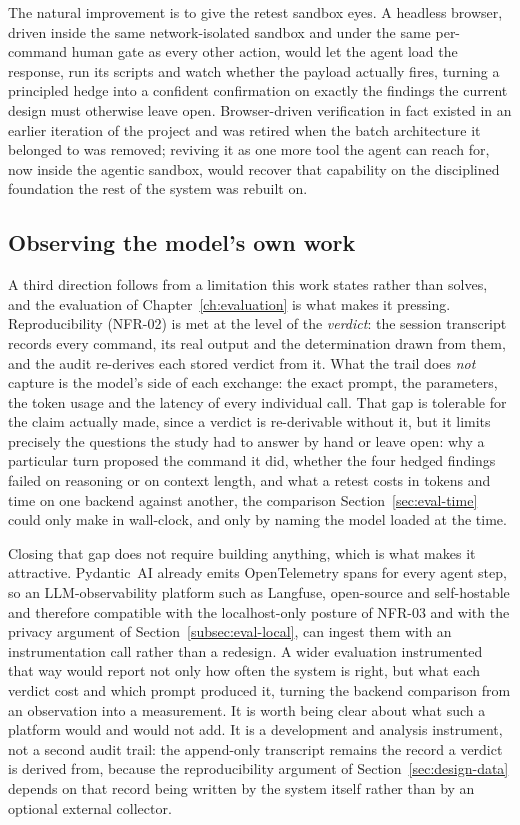 The natural improvement is to give the retest sandbox eyes. A headless browser, driven
inside the same network-isolated sandbox and under the same per-command human gate as
every other action, would let the agent load the response, run its scripts and watch
whether the payload actually fires, turning a principled hedge into a confident
confirmation on exactly the findings the current design must otherwise leave open.
Browser-driven verification in fact existed in an earlier iteration of the project and
was retired when the batch architecture it belonged to was removed; reviving it as one
more tool the agent can reach for, now inside the agentic sandbox, would recover that
capability on the disciplined foundation the rest of the system was rebuilt on.

\subsection{Observing the model's own work}
\label{subsec:future-observability}

A third direction follows from a limitation this work states rather than solves, and
the evaluation of Chapter~\ref{ch:evaluation} is what makes it pressing. Reproducibility
(NFR-02) is met at the level of the \emph{verdict}: the session transcript records every
command, its real output and the determination drawn from them, and the audit re-derives
each stored verdict from it. What the trail does \emph{not} capture is the model's side
of each exchange: the exact prompt, the parameters, the token usage and the latency of
every individual call. That gap is tolerable for the claim actually made, since a verdict
is re-derivable without it, but it limits precisely the questions the study
had to answer by hand or leave open: why a particular turn proposed the command it did,
whether the four hedged findings failed on reasoning or on context length, and what a
retest costs in tokens and time on one backend against another, the comparison
Section~\ref{sec:eval-time} could only make in wall-clock, and only by naming the model
loaded at the time.

Closing that gap does not require building anything, which is what makes it attractive.
Pydantic~AI already emits OpenTelemetry spans for every agent step, so an
LLM-observability platform such as Langfuse, open-source and
self-hostable and therefore compatible with the localhost-only posture of NFR-03 and
with the privacy argument of Section~\ref{subsec:eval-local}, can ingest them with an
instrumentation call rather than a redesign. A wider evaluation instrumented that way
would report not only how often the system is right, but what each verdict cost and
which prompt produced it, turning the backend comparison from an observation into a
measurement. It is worth being clear about what such a platform would and would not add.
It is a development and analysis instrument, not a second audit trail: the append-only
transcript remains the record a verdict is derived from, because the reproducibility
argument of Section~\ref{sec:design-data} depends on that record being written by the
system itself rather than by an optional external collector.

